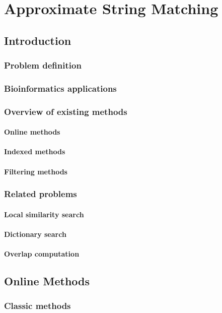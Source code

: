 \part{Approximate String Matching}

\chapter{Introduction}
\section{Problem definition}
\section{Bioinformatics applications}
\section{Overview of existing methods}
\subsection{Online methods}
\subsection{Indexed methods}
\subsection{Filtering methods}
\section{Related problems}
\subsection{Local similarity search}
\subsection{Dictionary search}
\subsection{Overlap computation}

\chapter{Online Methods}
\section{Classic methods}
